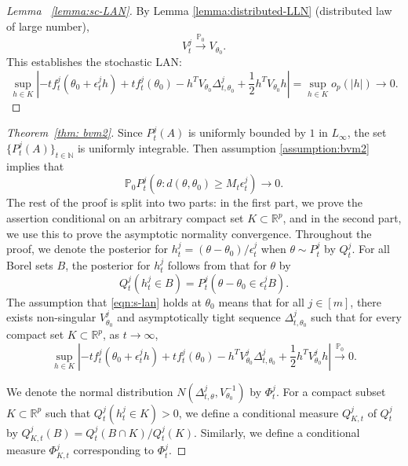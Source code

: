 \documentclass[twoside,11pt]{article}
\numberwithin{equation}{section}
\newcommand{\R}{{\mathbb{R}}}
\newcommand{\N}{{\mathbb{N}}}
\newcommand\bP{\mathbb{P}}
\newcommand{\pto}{\stackrel{\bP_0}{\to}}
\begin{document}
{\begin{proof}[Lemma ~\ref{lemma:sc-LAN}]
By Lemma \ref{lemma:distributed-LLN} (distributed law of large number), 
\begin{equation*}
    V_t^j \pto V_{\theta_0}. 
\end{equation*}
This establishes the stochastic LAN:
\begin{equation*}
\sup_{h \in K} \left| - t f_t^j(\theta_0 + \epsilon_t^j h) + t f_t^j(\theta_0) -h^T V_{\theta_0} \Delta_{t, \theta_0}^j + \frac{1}{2} h^T V_{\theta_0} h \right| = \sup_{h \in K}o_p(|h|) \to 0. 
\end{equation*}
\end{proof}
\begin{proof}[Theorem~\ref{thm: bvm2}]
Since $P_t^j\left(A \right)$ is uniformly bounded by $1$ in $L_\infty$, the set $\{P_t^j(A) \}_{t \in \N}$ is uniformly integrable. Then assumption \eqref{assumption:bvm2} implies that 
\begin{equation*} 
    \bP_0 P_t^j\left(\theta: d(\theta,  \theta_0) \geq M_t \epsilon_t^j \right) \to 0. 
\end{equation*}
The rest of the proof is split into two parts: in the first part, we prove the assertion conditional on an arbitrary compact set $K \subset \R^p$, and in the second part, we use this to prove the asymptotic normality convergence. Throughout the proof, we denote the posterior for $h_t^j = (\theta - \theta_0)/\epsilon_t^j$ when $\theta \sim P_t^j$ by $Q_t^j$. For all Borel sets $B$, the posterior for $h_t^j$ follows from that for $\theta$ by 
\begin{equation*}
    Q_t^j(h_t^j \in B) = P_t^j\left(\theta - \theta_0 \in \epsilon_t^j B \right). 
\end{equation*} 
The assumption that \eqref{eqn:s-lan} holds at $\theta_0$ means that for all $j \in [m]$, there exists non-singular $V_{\theta_0}^j$ and asymptotically tight sequence $\Delta_{t, \theta_0}^j$ such that for every compact set $K \subset \R^p$, as $t \to \infty$, 
\begin{equation} \label{eqn:s-lan-proof}
   \sup_{h \in K} \left| - t f_t^j(\theta_0 + \epsilon_t^j h) + t f_t^j(\theta_0)  -h^T V^j_{\theta_0} \Delta_{t, \theta_0}^j   + \frac{1}{2} h^T V_{\theta_0}^j h \right| \pto 0. 
\end{equation}

We denote the normal distribution $N(\Delta_{t, \theta}^j, V_{\theta_0}^{-1})$ by $\Phi_t^j$. For a compact subset $K \subset \R^p$ such that $Q_t^j(h_t^j \in K) > 0$, we define a conditional measure $Q_{K,t}^j$ of $Q_t^j$ by $Q_{K,t}^j(B) = Q_t^j(B \cap K)/Q_t^j(K)$. Similarly, we define a conditional measure $\Phi_{K,t}^j$ corresponding to $\Phi_t^j$.


\end{proof}}
\end{document}
